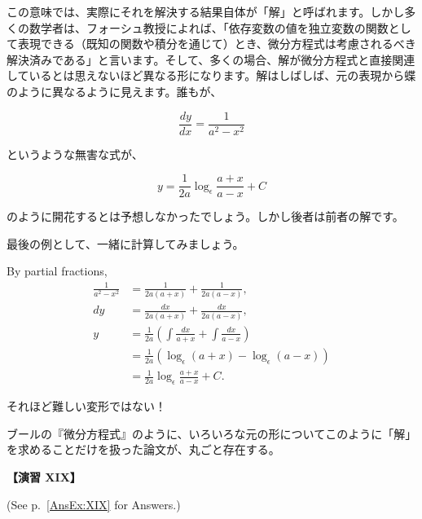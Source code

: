 \documentclass[a4paper,11pt,openany]{ltjsbook}
\newcommand{\Pageref}[2][p.]{#1~\ref{#2}}
\begin{document}
この意味では、実際にそれを解決する結果自体が「解」と呼ばれます。しかし多くの数学者は、フォーシュ教授によれば、「依存変数の値を独立変数の関数として表現できる（既知の関数や積分を通じて）とき、微分方程式は考慮されるべき解決済みである」と言います。そして、多くの場合、解が微分方程式と直接関連しているとは思えないほど異なる形になります。解はしばしば、元の表現から蝶のように異なるように見えます。誰もが、

\[
\dfrac{dy}{dx} = \dfrac{1}{a^2-x^2}
\]

というような無害な式が、

\[
y = \dfrac{1}{2a} \log_\epsilon \dfrac{a+x}{a-x} + C
\]

のように開花するとは予想しなかったでしょう。しかし後者は前者の解です。

最後の例として、一緒に計算してみましょう。

By partial fractions,
\begin{align*}
\frac{1}{a^2-x^2} &= \frac{1}{2a(a+x)} + \frac{1}{2a(a-x)},  \\
dy &= \frac {dx}{2a(a+x)}+ \frac{dx}{2a(a-x)},  \\
y  &= \frac{1}{2a}
       \left( \int \frac{dx}{a+x}
            + \int \frac{dx}{a-x} \right)  \\
   &= \frac{1}{2a} \left(\log_\epsilon (a+x) - \log_\epsilon (a-x) \right)  \\
   &= \frac{1}{2a} \log_\epsilon \frac{a+x}{a-x} + C.
\end{align*}

それほど難しい変形ではない！

ブールの『微分方程式』のように、いろいろな元の形についてこのように「解」を求めることだけを扱った論文が、丸ごと存在する。

\par\textbf{【演習 XIX】}\par (See \Pageref{AnsEx:XIX} for Answers.)
\end{document}
